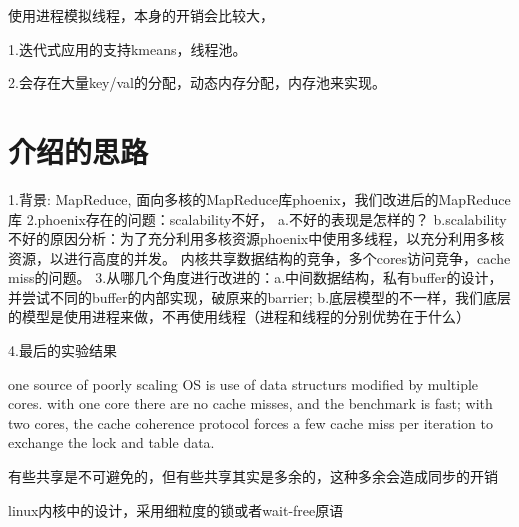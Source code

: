 使用进程模拟线程，本身的开销会比较大，

1.迭代式应用的支持kmeans，线程池。

2.会存在大量key/val的分配，动态内存分配，内存池来实现。

\section{介绍的思路}
1.背景: MapReduce, 面向多核的MapReduce库phoenix，我们改进后的MapReduce库
2.phoenix存在的问题：scalability不好，
a.不好的表现是怎样的？
b.scalability不好的原因分析：为了充分利用多核资源phoenix中使用多线程，以充分利用多核资源，以进行高度的并发。
内核共享数据结构的竞争，多个cores访问竞争，cache miss的问题。
3.从哪几个角度进行改进的：a.中间数据结构，私有buffer的设计，并尝试不同的buffer的内部实现，破原来的barrier; b.底层模型的不一样，我们底层的模型是使用进程来做，不再使用线程（进程和线程的分别优势在于什么）

4.最后的实验结果



one source of poorly scaling OS is use of data structurs modified by multiple cores.
with one core there are no cache misses, and the benchmark is fast; with two cores, the cache coherence protocol forces a few cache miss per iteration to exchange the lock and table data.

有些共享是不可避免的，但有些共享其实是多余的，这种多余会造成同步的开销

linux内核中的设计，采用细粒度的锁或者wait-free原语


